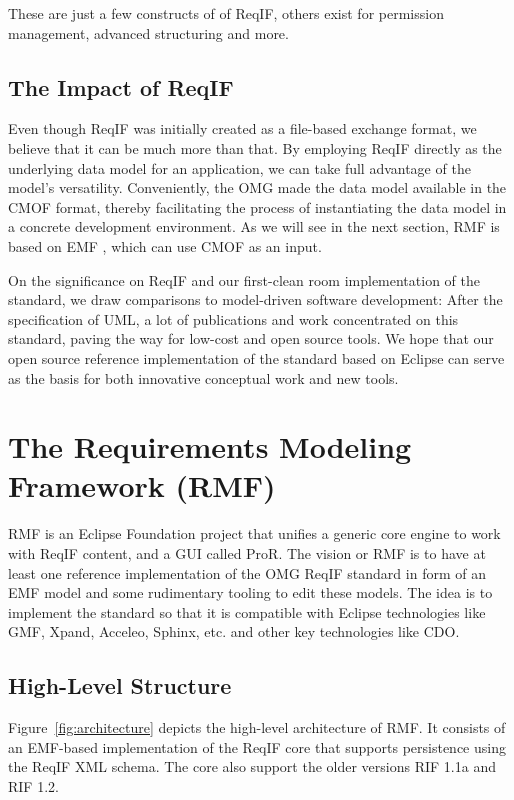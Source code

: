 \documentclass{template/openetcs_report}
\begin{document}
These are just a few constructs of of ReqIF, others exist for permission management, advanced structuring and more.

\subsection{The Impact of ReqIF}

Even though ReqIF was initially created as a file-based exchange format, we believe that it can be much more than that.  By employing ReqIF directly as the underlying data model for an application, we can take full advantage of the model's versatility.  Conveniently, the OMG made the data model available in the CMOF format, thereby facilitating the process of instantiating the data model in a concrete development environment.  As we will see in the next section, RMF is based on EMF \cite{emf}, which can use CMOF as an input.

On the significance on ReqIF and our first-clean room implementation of the standard, we draw comparisons to model-driven software development: After the specification of UML, a lot of publications and work concentrated on this standard, paving the way for low-cost and open source tools. We hope that our open source reference implementation of the standard based on Eclipse can serve as the basis for both innovative conceptual work and new tools.

\section{The Requirements Modeling Framework (RMF)}

RMF is an Eclipse Foundation project that unifies a generic core engine to work with ReqIF content, and a GUI called ProR.  The vision or RMF is to have at least one reference implementation of the OMG ReqIF standard in form of an EMF model and some rudimentary tooling to edit these models. The idea is to implement the standard so that it is compatible with Eclipse technologies like GMF, Xpand, Acceleo, Sphinx, etc. and other key technologies like CDO.

\subsection{High-Level Structure}

Figure~\ref{fig:architecture} depicts the high-level architecture of RMF. It consists of an EMF-based implementation of the ReqIF core that supports persistence using the ReqIF XML schema.  The core also support the older versions RIF 1.1a and RIF 1.2.
\end{document}

